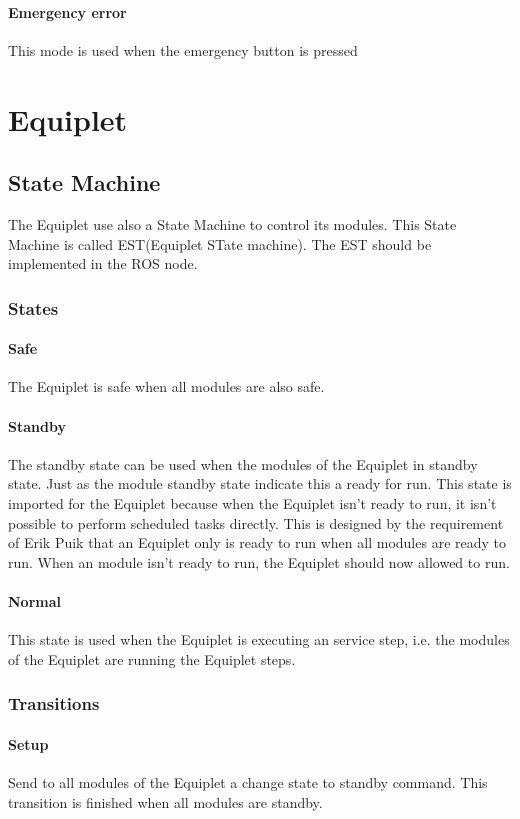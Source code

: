 \documentclass[12pt,a4paper]{report}
\begin{document}
\paragraph{Emergency error}This mode is used when the emergency button is pressed

\section{Equiplet}
\subsection{State Machine}
The Equiplet use also a State Machine to control its modules. This State Machine is called EST(Equiplet STate machine). The EST should be implemented in the ROS node.

\subsubsection{States}
\paragraph{Safe}The Equiplet is safe when all modules are also safe.
\paragraph{Standby}The standby state can be used when the modules of the Equiplet in standby state. Just as the module standby state indicate this a ready for run. This state is imported for the Equiplet because when the Equiplet isn’t ready to run, it isn’t possible to perform scheduled tasks directly. This is designed by the requirement of Erik Puik that an Equiplet only is ready to run when all modules are ready to run. When an module isn't ready to run, the Equiplet should now allowed to run.
\paragraph{Normal}This state is used when the Equiplet is executing an service step, i.e. the modules of the Equiplet are running the Equiplet steps. 

\subsubsection{Transitions}
\paragraph{Setup}Send to all modules of the Equiplet a change state to standby command. This transition is finished when all modules are standby.
\end{document}
